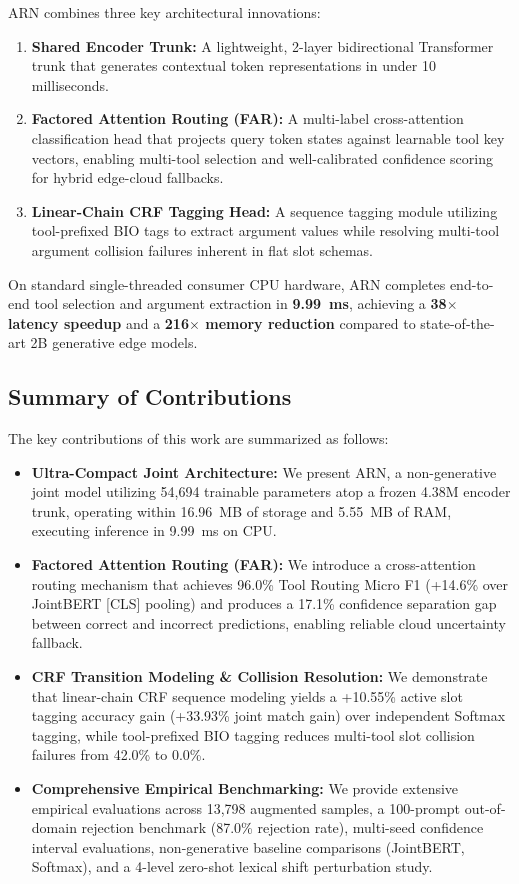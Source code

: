 \documentclass[conference]{IEEEtran}
\begin{document}
ARN combines three key architectural innovations:
\begin{enumerate}
    \item \textbf{Shared Encoder Trunk:} A lightweight, 2-layer bidirectional Transformer trunk that generates contextual token representations in under 10 milliseconds.
    \item \textbf{Factored Attention Routing (FAR):} A multi-label cross-attention classification head that projects query token states against learnable tool key vectors, enabling multi-tool selection and well-calibrated confidence scoring for hybrid edge-cloud fallbacks.
    \item \textbf{Linear-Chain CRF Tagging Head:} A sequence tagging module utilizing tool-prefixed BIO tags to extract argument values while resolving multi-tool argument collision failures inherent in flat slot schemas.
\end{enumerate}

On standard single-threaded consumer CPU hardware, ARN completes end-to-end tool selection and argument extraction in \textbf{9.99~ms}, achieving a \textbf{38$\times$ latency speedup} and a \textbf{216$\times$ memory reduction} compared to state-of-the-art 2B generative edge models.

\subsection{Summary of Contributions}

The key contributions of this work are summarized as follows:
\begin{itemize}
    \item \textbf{Ultra-Compact Joint Architecture:} We present ARN, a non-generative joint model utilizing 54,694 trainable parameters atop a frozen 4.38M encoder trunk, operating within 16.96~MB of storage and 5.55~MB of RAM, executing inference in 9.99~ms on CPU.
    \item \textbf{Factored Attention Routing (FAR):} We introduce a cross-attention routing mechanism that achieves 96.0\% Tool Routing Micro F1 (+14.6\% over JointBERT [CLS] pooling) and produces a 17.1\% confidence separation gap between correct and incorrect predictions, enabling reliable cloud uncertainty fallback.
    \item \textbf{CRF Transition Modeling \& Collision Resolution:} We demonstrate that linear-chain CRF sequence modeling yields a +10.55\% active slot tagging accuracy gain (+33.93\% joint match gain) over independent Softmax tagging, while tool-prefixed BIO tagging reduces multi-tool slot collision failures from 42.0\% to 0.0\%.
    \item \textbf{Comprehensive Empirical Benchmarking:} We provide extensive empirical evaluations across 13,798 augmented samples, a 100-prompt out-of-domain rejection benchmark (87.0\% rejection rate), multi-seed confidence interval evaluations, non-generative baseline comparisons (JointBERT, Softmax), and a 4-level zero-shot lexical shift perturbation study.
\end{itemize}
\end{document}
